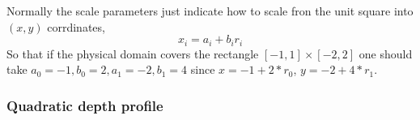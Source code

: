 Normally the scale parameters just indicate how to scale fron the unit square
into $(x,y)$ corrdinates,
\[
      x_i = a_i + b_i r_i
\]
So that if the physical domain covers the rectangle $[-1,1]\times[-2,2]$ one should take
$a_0=-1, b_0=2, a_1=-2, b_1=4$ since $x=-1+2*r_0$, $y=-2+4*r_1$.



% 
% 
% 


\subsubsection{Quadratic depth profile}

